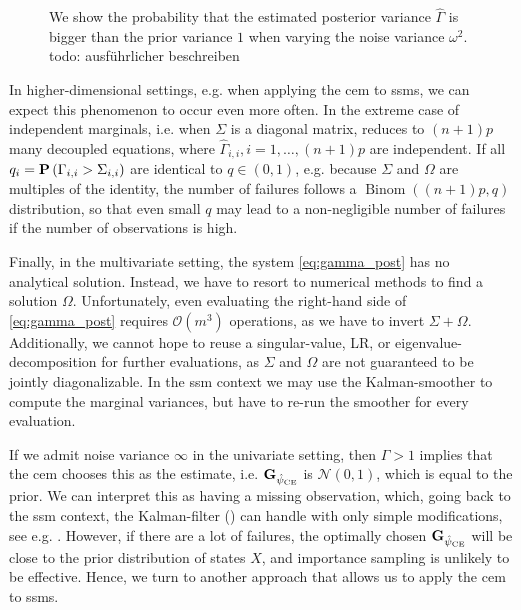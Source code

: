 \begin{figure}
    \resizebox{\textwidth}{!}{%
    }
    \caption{
        We show the probability that the estimated posterior variance $\hat \Gamma$ is bigger than the prior variance $1$ when varying the noise variance $\omega^{2}$. {\color{red} todo: ausführlicher beschreiben} %
    }
    \label{fig:ce_prob_failure}
\end{figure}

In higher-dimensional settings, e.g. when applying the \gls{cem} to \glspl{ssm}, we can expect this phenomenon to occur even more often. In the extreme case of independent marginals, i.e. when $\Sigma$ is a diagonal matrix,  reduces to $(n + 1)p$ many decoupled equations, where $\hat \Gamma_{i,i}, i =1, \dots, (n + 1)p$ are independent. If all $q_{i} = \P \left(\Gamma_{i,i} > \Sigma_{i,i}\right)$ are identical to $q \in (0, 1)$, e.g. because $\Sigma$ and $\Omega$ are multiples of the identity, the number of failures follows a $\operatorname{Binom} \left( (n + 1)p, q \right)$ distribution, so that even small $q$ may lead to a non-negligible number of failures if the number of observations is high. 

Finally, in the multivariate setting, the system \eqref{eq:gamma_post} has no analytical solution. Instead, we have to resort to numerical methods to find a solution $\Omega$. Unfortunately, even evaluating the right-hand side of \eqref{eq:gamma_post} requires $\mathcal O(m^3)$ operations, as we have to invert $\Sigma + \Omega$. Additionally, we cannot hope to reuse a singular-value, LR, or eigenvalue-decomposition for further evaluations, as $\Sigma$ and $\Omega$ are not guaranteed to be jointly diagonalizable.
In the \gls{ssm} context we may use the Kalman-smoother to compute the marginal variances, but have to re-run the smoother for every evaluation. 

If we admit noise variance $\infty$ in the univariate setting, then $\Gamma > 1$ implies that the \gls{cem} chooses this as the estimate, i.e. $\G_{\hpce}$ is $\mathcal N(0, 1)$, which is equal to the prior. We can interpret this as having a missing observation, which, going back to the \gls{ssm} context, the Kalman-filter () can handle with only simple modifications, see e.g. \cite[Section 4.10]{Durbin2012Time}. However, if there are a lot of failures, the optimally chosen $\G_{\hpce}$ will be close to the prior distribution of states $X$, and importance sampling is unlikely to be effective. Hence, we turn to another approach that allows us to apply the \gls{cem} to \glspl{ssm}.

